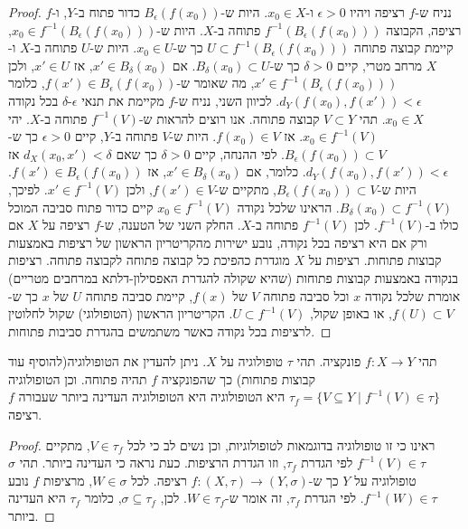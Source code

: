 \documentclass{tstextbook}
\begin{document}
\begin{proof}
נניח ש-\(f\) רציפה ויהיו \(\epsilon > 0\) ו-\(x_0 \in X\). היות ש-\(B_\epsilon(f(x_0))\) כדור פתוח ב-\(Y\), ו-\(f\) רציפה, הקבוצה \(f^{-1}(B_\epsilon(f(x_0)))\) פתוחה ב-\(X\). היות ש-\(x_0 \in f^{-1}(B_\epsilon(f(x_0)))\), קיימת קבוצה פתוחה \(U \subset f^{-1}(B_\epsilon(f(x_0)))\) כך ש-\(x_0 \in U\). היות ש-\(U\) פתוחה ב-\(X\) ו-\(X\) מרחב מטרי, קיים \(\delta > 0\) כך ש-\(B_\delta(x_0) \subset U\). אם \(x' \in B_\delta(x_0)\), אז \(x' \in U\), ולכן \(x' \in f^{-1}(B_\epsilon(f(x_0)))\), מה שאומר ש-\(f(x') \in B_\epsilon(f(x_0))\), כלומר \(d_Y(f(x_0), f(x')) < \epsilon\).
לכיוון השני, נניח ש-\(f\) מקיימת את תנאי \(\epsilon\)-\(\delta\) בכל נקודה \(x_0 \in X\). תהי \(V \subset Y\) קבוצה פתוחה. אנו רוצים להראות ש-\(f^{-1}(V)\) פתוחה ב-\(X\). יהי \(x_0 \in f^{-1}(V)\). אז \(f(x_0) \in V\). היות ש-\(V\) פתוחה ב-\(Y\), קיים \(\epsilon > 0\) כך ש-\(B_\epsilon(f(x_0)) \subset V\). לפי ההנחה, קיים \(\delta > 0\) כך שאם \(d_X(x_0, x') < \delta\) אז \(d_Y(f(x_0), f(x')) < \epsilon\). כלומר, אם \(x' \in B_\delta(x_0)\), אז \(f(x') \in B_\epsilon(f(x_0))\). היות ש-\(B_\epsilon(f(x_0)) \subset V\), מתקיים ש-\(f(x') \in V\), ולכן \(x' \in f^{-1}(V)\). לפיכך, \(B_\delta(x_0) \subset f^{-1}(V)\). הראינו שלכל נקודה \(x_0 \in f^{-1}(V)\) קיים כדור פתוח סביבה המוכל כולו ב-\(f^{-1}(V)\). לכן \(f^{-1}(V)\) פתוחה ב-\(X\).
החלק השני של הטענה, ש-\(f\) רציפה על \(X\) אם ורק אם היא רציפה בכל נקודה, נובע ישירות מהקריטריון הראשון של רציפות באמצעות קבוצות פתוחות. רציפות על \(X\) מוגדרת כהפיכת כל קבוצה פתוחה לקבוצה פתוחה. רציפות בנקודה באמצעות קבוצות פתוחות (שהיא שקולה להגדרת האפסילון-דלתא במרחבים מטריים) אומרת שלכל נקודה \(x\) וכל סביבה פתוחה \(V\) של \(f(x)\), קיימת סביבה פתוחה \(U\) של \(x\) כך ש-\(f(U) \subset V\), או באופן שקול, \(U \subset f^{-1}(V)\). הקריטריון הראשון (הטופולוגי) שקול לחלוטין לרציפות בכל נקודה כאשר משתמשים בהגדרת סביבות פתוחות.

\end{proof}
\begin{proposition}
תהי \(f:X\to Y\) פונקציה. תהי \(\tau\) טופולוגיה על \(X\). ניתן להעדין את הטופולוגיה(להוסיף עוד קבוצות פתוחות) כך שהפונקציה \(f\) תהיה פתוחה. וכן הטופולוגיה \(\tau_f = \{ V \subseteq Y \mid f^{-1}(V) \in \tau \}\) היא הטופולוגיה היא הטופולוגיה העדינה ביותר שעבורה \(f\) רציפה.

\end{proposition}
\begin{proof}
ראינו כי זו טופולוגיה בדוגמאות לטופולוגיות, וכן נשים לב כי לכל \(V \in \tau_f\), מתקיים \(f^{-1}(V) \in \tau\) לפי הגדרת \(\tau_f\), וזו הגדרת הרציפות.
כעת נראה כי העדינה ביותר. תהי \(\sigma\) טופולוגיה על \(Y\) כך ש-\(f: (X, \tau) \to (Y, \sigma)\) רציפה. לכל \(W \in \sigma\), מרציפות \(f\) נובע \(f^{-1}(W) \in \tau\). לפי הגדרת \(\tau_f\), זה אומר ש-\(W \in \tau_f\). לכן, \(\sigma \subseteq \tau_f\), כלומר \(\tau_f\) היא העדינה ביותר.

\end{proof}
\end{document}
